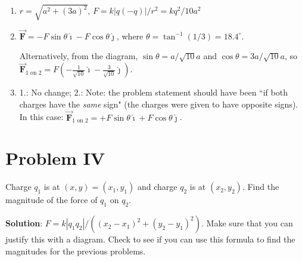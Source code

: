 \documentclass{article}
\renewcommand{\mbox}{\text}
\newcommand{\ds}[0]{\displaystyle}
\newcommand{\ihat}[0]{\hat{\boldsymbol{\imath}}}
\newcommand{\jhat}[0]{\hat{\boldsymbol{\jmath}}}
\newcommand{\bfvec}[1]{\vec{\mathbf{#1}}}
\begin{document}
    \begin{enumerate}

      \item $r=\sqrt{a^2+(3a)^2}$, $F=k|q(-q)|/r^2=kq^2/10a^2$

      \item $\bfvec{F}=-F\sin\theta\ihat - F\cos\theta\jhat$, where $\theta=\tan^{-1}(1/3)=18.4^\circ$.

                Alternatively, from the diagram, $\sin\theta = a/\sqrt{10}a$ and $\cos\theta = 3a/\sqrt{10}a$, so 
                $\ds\bfvec{F}_{1\mbox{ on } 2} = F\left(-\frac{1}{\sqrt{10}}\ihat - \frac{3}{\sqrt{10}}\jhat\right)$.

      \item 1.: No change; 2.: Note: the problem statement should have been ``if both charges have the \emph{same} sign" (the charges were given to have opposite signs). In this case: $\bfvec{F}_{1\mbox{ on } 2}=+F\sin\theta\ihat + F\cos\theta\jhat$.

    \end{enumerate}
\else


\fi
\ifsolutions\else

\fi

\section{Problem IV}

Charge $q_1$ is at $(x,y)=(x_1,y_1)$ and charge $q_2$ is at $(x_2, y_2)$. Find the magnitude of the force of $q_1$ on $q_2$.

\ifsolutions
{\bf Solution}: $F=k|q_1q_2|/\left((x_2-x_1)^2 + (y_2-y_1)^2\right)$. Make sure that you can justify this with a diagram. Check to see if you can use this formula to find the magnitudes for the previous problems.
\fi
\end{document}
